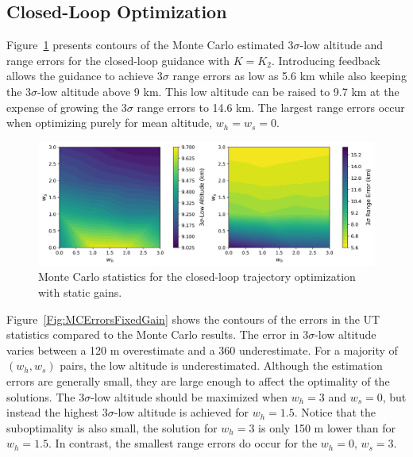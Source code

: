 \subsection{Closed-Loop Optimization}
Figure~\ref{Fig:MCResultsFixedGain} presents contours of the Monte Carlo estimated 3$\sigma$-low altitude and range errors for the closed-loop guidance with $K=K_2$. Introducing feedback allows the guidance to achieve 3$\sigma$ range errors as low as 5.6 km while also keeping the 3$\sigma$-low altitude above 9 km. This low altitude can be raised to 9.7 km at the expense of growing the 3$\sigma$ range errors to 14.6 km. The largest range errors occur when optimizing purely for mean altitude, $w_h=w_s=0$. 
\begin{figure}[h!]
	\centering
	\includegraphics[width=1\textwidth]{Images/Reestimated_WeightSweepMCResults}
	\caption{Monte Carlo statistics for the closed-loop trajectory optimization with static gains.}
	\label{Fig:MCResultsFixedGain}
\end{figure}
Figure~\ref{Fig:MCErrorsFixedGain} shows the contours of the errors in the UT statistics compared to the Monte Carlo results. The error in 3$\sigma$-low altitude varies between a 120 m overestimate and a 360 underestimate. For a majority of $(w_h,w_s)$ pairs, the low altitude is underestimated. Although the estimation errors are generally small, they are large enough to affect the optimality of the solutions. The 3$\sigma$-low altitude should be maximized when $w_h=3$ and $w_s=0$, but instead the highest 3$\sigma$-low altitude is achieved for $w_h=1.5$. Notice that the suboptimality is also small, the solution for $w_h=3$ is only 150 m lower than for $w_h=1.5$. In contrast, the smallest range errors do occur for the $w_h=0,\,w_s=3$. 
